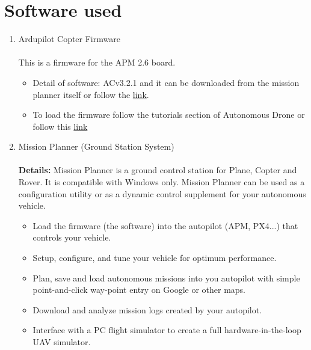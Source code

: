 \documentclass[a4paper,12pt,oneside]{book}
\begin{document}
\section{Software used}
\begin{enumerate}
    \item Ardupilot Copter Firmware
        \paragraph{}This is a firmware for the APM 2.6 board.
        \begin{itemize}
          \item Detail of software: ACv3.2.1 and it can be downloaded from the mission planner itself or follow the \href{http://firmware.ardupilot.org/Copter/stable/apm2-quad/}{link}.
          \item To load the firmware follow the tutorials section of Autonomous Drone or follow this \href{https://github.com/eYSIP-2016/Autonomous-Drone/tree/master/Tutorials/Calibarting-APM}{link}
        \end{itemize}
  \item Mission Planner (Ground Station System)
    \paragraph{}\textbf{Details:} Mission Planner is a ground control station for Plane, Copter and Rover. It is compatible with Windows only. Mission Planner can be used as a configuration utility or as a dynamic control supplement for your autonomous vehicle.
        \begin{itemize}
          \item Load the firmware (the software) into the autopilot (APM, PX4...) that controls your vehicle.
          \item Setup, configure, and tune your vehicle for optimum performance.
          \item Plan, save and load autonomous missions into you autopilot with simple point-and-click way-point entry on Google or other maps.
          \item Download and analyze mission logs created by your autopilot.
          \item Interface with a PC flight simulator to create a full hardware-in-the-loop UAV simulator.
        

\end{itemize}
\end{enumerate}
\end{document}
